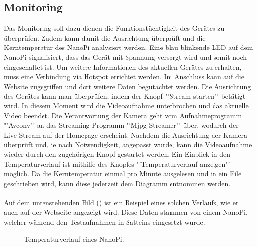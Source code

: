 \subsection{Monitoring}
Das Monitoring soll dazu dienen die Funktionstüchtigkeit des Gerätes zu überprüfen. Zudem kann damit die Ausrichtung überprüft und die Kerntemperatur des NanoPi analysiert werden. Eine blau blinkende LED auf dem NanoPi signalisiert, dass das Gerät mit Spannung versorgt wird und somit noch eingeschaltet ist. Um weitere Informationen des aktuellen Gerätes zu erhalten, muss eine Verbindung via Hotspot errichtet werden. Im Anschluss kann auf die Website zugegriffen und dort weitere Daten begutachtet werden. Die Ausrichtung des Gerätes kann man überprüfen, indem der Knopf "'Stream starten"' betätigt wird. In diesem Moment wird die Videoaufnahme unterbrochen und das aktuelle Video beendet. Die Verantwortung der Kamera geht vom Aufnahmeprogramm "'Avconv"' an das Streaming Programm "'Mjpg-Streamer"' über, wodurch der Live-Stream auf der Homepage erscheint. Nachdem die Ausrichtung der Kamera überprüft und, je nach Notwendigkeit, angepasst wurde, kann die Videoaufnahme wieder durch den zugehörigen Knopf gestartet werden. Ein Einblick in den Temperaturverlauf ist mithilfe des Knopfes "'Temperaturverlauf anzeigen"' möglich. Da die Kerntemperatur einmal pro Minute ausgelesen und in ein File geschrieben wird, kann diese jederzeit dem Diagramm entnommen werden. \\\\
Auf dem untenstehenden Bild () ist ein Beispiel eines solchen Verlaufs, wie er auch auf der Webseite angezeigt wird. Diese Daten stammen von einem NanoPi, welcher während den Testaufnahmen in Satteins eingesetzt wurde.

\begin{figure}[H]
  \centering
  \caption{Temperaturverlauf eines NanoPi.}
  \label{bTemperature}
\end{figure} 